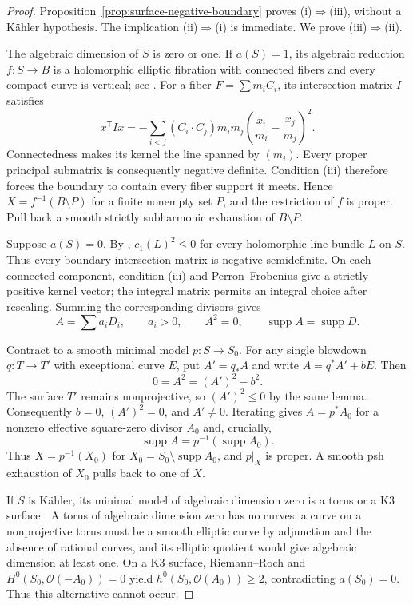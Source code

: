 \documentclass[11pt]{amsart}
\theoremstyle{definition}
\theoremstyle{remark}
\numberwithin{equation}{section}
\newcommand{\OO}{\mathcal O}
\newcommand{\supp}{\operatorname{supp}}
\begin{document}
\begin{proof}
Proposition~\ref{prop:surface-negative-boundary} proves
\textup{(i)}$\Rightarrow$\textup{(iii)}, without a K\"ahler hypothesis.
The implication \textup{(ii)}$\Rightarrow$\textup{(i)} is immediate.
We prove \textup{(iii)}$\Rightarrow$\textup{(ii)}.

The algebraic dimension of $S$ is zero or one. If $a(S)=1$, its algebraic reduction $f:S\to
B$ is a holomorphic elliptic fibration with connected fibers and every compact curve is
vertical; see \cite[Section~2]{FN2005}. For a fiber $F=\sum m_iC_i$, its intersection matrix
$I$ satisfies
\begin{equation}\label{eq:surface-fiber-intersection-identity}
 x^{\mathsf T}Ix=-\sum_{i<j}(C_i\cdot C_j)m_im_j
       \left(\frac{x_i}{m_i}-\frac{x_j}{m_j}\right)^2.
\end{equation}
Connectedness makes its kernel the line spanned by $(m_i)$. Every proper principal submatrix
is consequently negative definite. Condition \textup{(iii)} therefore forces the boundary to
contain every fiber support it meets. Hence $X=f^{-1}(B\setminus P)$ for a finite nonempty
set $P$, and the restriction of $f$ is proper. Pull back a smooth strictly subharmonic
exhaustion of $B\setminus P$.

Suppose $a(S)=0$. By \cite[Lemma 2.1(1)]{FN2005}, $c_1(L)^2\le0$ for every holomorphic line
bundle $L$ on $S$. Thus every boundary intersection matrix is negative semidefinite. On each
connected component, condition \textup{(iii)} and Perron--Frobenius give a strictly positive
kernel vector; the integral matrix permits an integral choice after rescaling. Summing the
corresponding divisors gives
\[
 A=\sum a_iD_i,\qquad a_i>0,\qquad A^2=0,
 \qquad\supp A=\supp D.
\]

Contract to a smooth minimal model $p:S\to S_0$. For any single blowdown $q:T\to T'$ with
exceptional curve $E$, put $A'=q_*A$ and write $A=q^*A'+bE$. Then
\[
 0=A^2=(A')^2-b^2.
\]
The surface $T'$ remains nonprojective, so $(A')^2\le0$ by the same lemma. Consequently
$b=0$, $(A')^2=0$, and $A'\ne0$. Iterating gives $A=p^*A_0$ for a nonzero effective
square-zero divisor $A_0$ and, crucially,
\[
 \supp A=p^{-1}(\supp A_0).
\]
Thus $X=p^{-1}(X_0)$ for $X_0=S_0\setminus\supp A_0$, and $p|_X$ is proper. A smooth psh
exhaustion of $X_0$ pulls back to one of $X$.

If $S$ is K\"ahler, its minimal model of algebraic dimension zero is a torus or a K3 surface
\cite[Section~2]{FN2005}. A torus of algebraic dimension zero has no curves: a curve on a
nonprojective torus must be a smooth elliptic curve by adjunction and the absence of
rational curves, and its elliptic quotient would give algebraic dimension at least one. On a
K3 surface, Riemann--Roch and $H^0(S_0,\OO(-A_0))=0$ yield $h^0(S_0,\OO(A_0))\ge2$,
contradicting $a(S_0)=0$. Thus this alternative cannot occur.


\end{proof}
\end{document}
